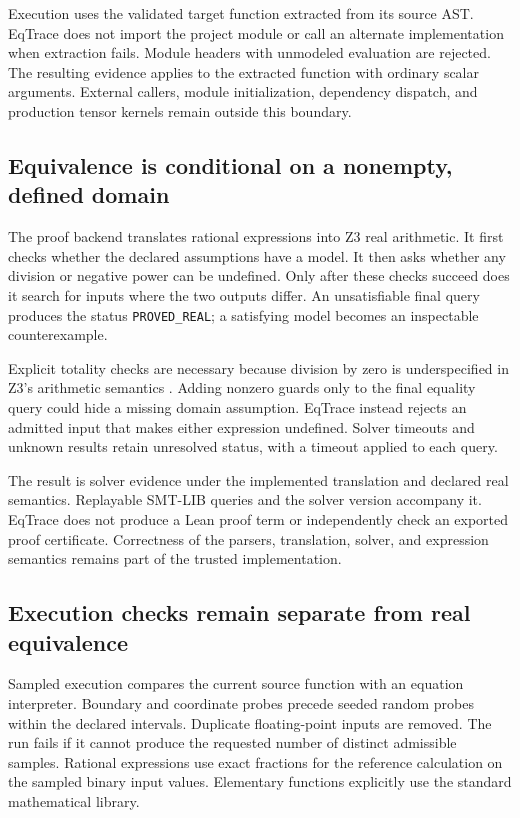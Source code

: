 Execution uses the validated target function extracted from its source AST. EqTrace does not import the project module or call an alternate implementation when extraction fails. Module headers with unmodeled evaluation are rejected. The resulting evidence applies to the extracted function with ordinary scalar arguments. External callers, module initialization, dependency dispatch, and production tensor kernels remain outside this boundary.

\subsection{Equivalence is conditional on a nonempty, defined domain}
The proof backend translates rational expressions into Z3 real arithmetic. It first checks whether the declared assumptions have a model. It then asks whether any division or negative power can be undefined. Only after these checks succeed does it search for inputs where the two outputs differ. An unsatisfiable final query produces the status \texttt{PROVED\_REAL}; a satisfying model becomes an inspectable counterexample.

Explicit totality checks are necessary because division by zero is underspecified in Z3's arithmetic semantics \citep{Z3Arithmetic2026}. Adding nonzero guards only to the final equality query could hide a missing domain assumption. EqTrace instead rejects an admitted input that makes either expression undefined. Solver timeouts and unknown results retain unresolved status, with a timeout applied to each query.

The result is solver evidence under the implemented translation and declared real semantics. Replayable SMT-LIB queries and the solver version accompany it. EqTrace does not produce a Lean proof term or independently check an exported proof certificate. Correctness of the parsers, translation, solver, and expression semantics remains part of the trusted implementation.

\subsection{Execution checks remain separate from real equivalence}
Sampled execution compares the current source function with an equation interpreter. Boundary and coordinate probes precede seeded random probes within the declared intervals. Duplicate floating-point inputs are removed. The run fails if it cannot produce the requested number of distinct admissible samples. Rational expressions use exact fractions for the reference calculation on the sampled binary input values. Elementary functions explicitly use the standard mathematical library.

